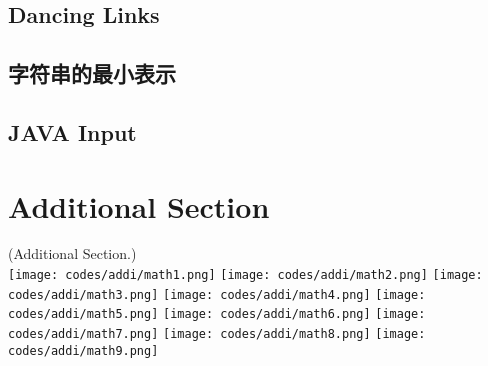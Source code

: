 \documentclass[a4papar,landscape]{article}
\begin{document}
\begin{multicols}{2}
	\subsection{Dancing Links}
		
	\subsection{字符串的最小表示}
		

	\lstset{language=Java}
	\subsection{JAVA Input}
		
	\lstset{language=C++}
	
\section{Additional Section}
	(Additional Section.)\\
	\texttt{[image: codes/addi/math1.png]}
	\texttt{[image: codes/addi/math2.png]}
	\texttt{[image: codes/addi/math3.png]}
	\texttt{[image: codes/addi/math4.png]}
	\texttt{[image: codes/addi/math5.png]}
	\texttt{[image: codes/addi/math6.png]}
	\texttt{[image: codes/addi/math7.png]}
	\texttt{[image: codes/addi/math8.png]}
	\texttt{[image: codes/addi/math9.png]}


\end{multicols}
\end{document}
